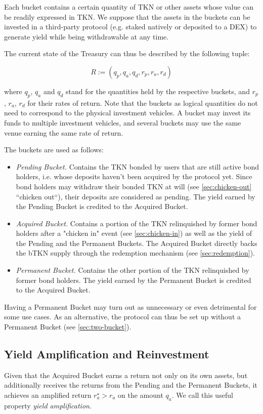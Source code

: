 \documentclass{article}
\begin{document}
Each bucket contains a certain quantity of TKN or other assets whose value can be readily expressed in TKN. We suppose that the assets in the buckets can be invested in a third-party protocol (e.g. staked natively or deposited to a DEX) to generate yield while being withdrawable at any time. 

The current state of the Treasury can thus be described by the following tuple:

\begin{equation}
  \label{eq:treasury}
    R:=(q_p, q_a, q_d, r_p, r_a, r_d)
\end{equation}

where $q_p$, $q_a$ and $q_d$ stand for the quantities held by the respective buckets, and $r_p$, $r_a$, $r_d$ for their rates of return. Note that the buckets as logical quantities do not need to correspond to the physical investment vehicles. A bucket may invest its funds to multiple investment vehicles, and several buckets may use the same venue earning the same rate of return.

The buckets are used as follows:
\begin{itemize}
    \item \textit{Pending Bucket.} Contains the TKN bonded by users that are still active bond holders, i.e. whose deposits haven’t been acquired by the protocol yet. Since bond holders may withdraw their bonded TKN at will (see \ref{sec:chicken-out} “chicken out“), their deposits are considered as pending. The yield earned by the Pending Bucket is credited to the Acquired Bucket.
    \item \textit{Acquired Bucket.} Contains a portion of the TKN relinquished by former bond holders after a "chicken in" event (see \ref{sec:chicken-in}) as well as the yield of the Pending and the Permanent Buckets. The Acquired Bucket directly backs the bTKN supply through the redemption mechanism (see \ref{sec:redemption}).
    \item \textit{Permanent Bucket.} Contains the other portion of the TKN relinquished by former bond holders. The yield earned by the Permanent Bucket is credited to the Acquired Bucket.
\end{itemize}

Having a Permanent Bucket may turn out as unnecessary or even detrimental for some use cases. As an alternative, the protocol can thus be set up without a Permanent Bucket (see \ref{sec:two-bucket}).

\subsection{Yield Amplification and Reinvestment}
Given that the Acquired Bucket earns a return not only on its own assets, but additionally receives the returns from the Pending and the Permanent Buckets, it achieves an amplified return $r_a^\star > r_a$ on the amount $q_a$. We call this useful property \textit{yield amplification}.
\end{document}
